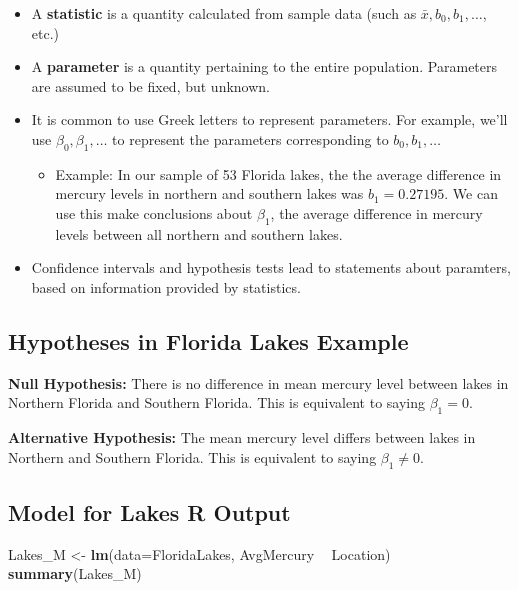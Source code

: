\documentclass[]{book}
\newenvironment{Shaded}{\begin{snugshade}}{\end{snugshade}}
\newcommand{\KeywordTok}[1]{\textcolor[rgb]{0.13,0.29,0.53}{\textbf{#1}}}
\newcommand{\DataTypeTok}[1]{\textcolor[rgb]{0.13,0.29,0.53}{#1}}
\newcommand{\StringTok}[1]{\textcolor[rgb]{0.31,0.60,0.02}{#1}}
\newcommand{\OperatorTok}[1]{\textcolor[rgb]{0.81,0.36,0.00}{\textbf{#1}}}
\newcommand{\NormalTok}[1]{#1}
\providecommand{\tightlist}{%
  \setlength{\itemsep}{0pt}\setlength{\parskip}{0pt}}
\begin{document}
\begin{itemize}
\item
  A \textbf{statistic} is a quantity calculated from sample data (such
  as \(\bar{x}, b_0, b_1, \ldots\), etc.)
\item
  A \textbf{parameter} is a quantity pertaining to the entire
  population. Parameters are assumed to be fixed, but unknown.
\item
  It is common to use Greek letters to represent parameters. For
  example, we'll use \(\beta_0, \beta_1, \ldots\) to represent the
  parameters corresponding to \(b_0, b_1, \ldots\)

  \begin{itemize}
  \tightlist
  \item
    Example: In our sample of 53 Florida lakes, the the average
    difference in mercury levels in northern and southern lakes was
    \(b_1=0.27195\). We can use this make conclusions about \(\beta_1\),
    the average difference in mercury levels between all northern and
    southern lakes.
  \end{itemize}
\item
  Confidence intervals and hypothesis tests lead to statements about
  paramters, based on information provided by statistics.
\end{itemize}

\subsection{Hypotheses in Florida Lakes
Example}\label{hypotheses-in-florida-lakes-example}

\textbf{Null Hypothesis:} There is no difference in mean mercury level
between lakes in Northern Florida and Southern Florida. This is
equivalent to saying \(\beta_1=0\).

\textbf{Alternative Hypothesis:} The mean mercury level differs between
lakes in Northern and Southern Florida. This is equivalent to saying
\(\beta_1\neq0\).

\subsection{Model for Lakes R Output}\label{model-for-lakes-r-output-2}

\begin{Shaded}
\begin{Highlighting}[]
\NormalTok{Lakes_M <-}\StringTok{ }\KeywordTok{lm}\NormalTok{(}\DataTypeTok{data=}\NormalTok{FloridaLakes, AvgMercury }\OperatorTok{~}\StringTok{ }\NormalTok{Location)}
\KeywordTok{summary}\NormalTok{(Lakes_M)}
\end{Highlighting}
\end{Shaded}
\end{document}
